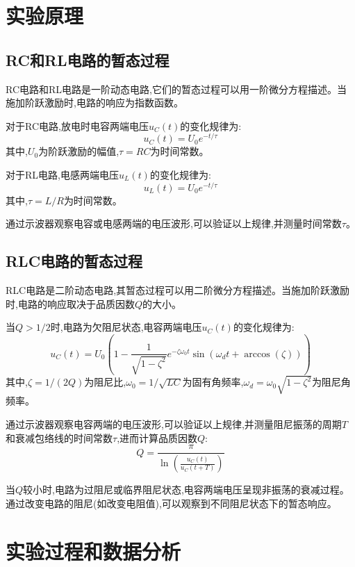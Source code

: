 \documentclass[UTF8]{ctexart}
\begin{document}
\section{实验原理}

\subsection{RC和RL电路的暂态过程}

RC电路和RL电路是一阶动态电路,它们的暂态过程可以用一阶微分方程描述。当施加阶跃激励时,电路的响应为指数函数。

对于RC电路,放电时电容两端电压$u_C(t)$的变化规律为:
\begin{equation}
    u_C(t) = U_0 e^{-t/\tau}
\end{equation}
其中,$U_0$为阶跃激励的幅值,$\tau = RC$为时间常数。

对于RL电路,电感两端电压$u_L(t)$的变化规律为:
\begin{equation}
    u_L(t) = U_0 e^{-t/\tau}
\end{equation}
其中,$\tau = L/R$为时间常数。

通过示波器观察电容或电感两端的电压波形,可以验证以上规律,并测量时间常数$\tau$。

\subsection{RLC电路的暂态过程}

RLC电路是二阶动态电路,其暂态过程可以用二阶微分方程描述。当施加阶跃激励时,电路的响应取决于品质因数$Q$的大小。

当$Q > 1/2$时,电路为欠阻尼状态,电容两端电压$u_C(t)$的变化规律为:
\begin{equation}
    u_C(t) = U_0 (1 - \frac{1}{\sqrt{1-\zeta^2}} e^{-\zeta \omega_0 t} \sin(\omega_d t + \arccos(\zeta)))
\end{equation}
其中,$\zeta = 1/(2Q)$为阻尼比,$\omega_0 = 1/\sqrt{LC}$为固有角频率,$\omega_d = \omega_0 \sqrt{1-\zeta^2}$为阻尼角频率。

通过示波器观察电容两端的电压波形,可以验证以上规律,并测量阻尼振荡的周期$T$和衰减包络线的时间常数$\tau$,进而计算品质因数$Q$:
\begin{equation}
    Q = \frac{\pi}{\ln(\frac{u_C(t)}{u_C(t+T)})}
\end{equation}

当$Q$较小时,电路为过阻尼或临界阻尼状态,电容两端电压呈现非振荡的衰减过程。通过改变电路的阻尼(如改变电阻值),可以观察到不同阻尼状态下的暂态响应。
\newpage
\section{实验过程和数据分析}
\end{document}
